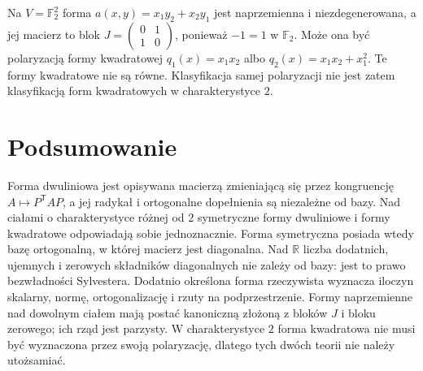 \begin{przyklad}
\label{prz:lin9-char2-formy}
Na \(V=\mathbb F_2^2\) forma
\(a(x,y)=x_1y_2+x_2y_1\)
jest naprzemienna i niezdegenerowana,
a jej macierz to blok
\(J=\begin{pmatrix}0&1\\1&0\end{pmatrix}\),
ponieważ \(-1=1\) w \(\mathbb F_2\).
Może ona być polaryzacją formy
kwadratowej \(q_1(x)=x_1x_2\)
albo \(q_2(x)=x_1x_2+x_1^2\).
Te formy kwadratowe nie są równe.
Klasyfikacja samej polaryzacji
nie jest zatem klasyfikacją
form kwadratowych
w charakterystyce \(2\).
\end{przyklad}

\section{Podsumowanie}
\label{sec:lin9-podsumowanie}

Forma dwuliniowa jest opisywana
macierzą zmieniającą się
przez kongruencję
\(A\mapsto P^{\mathsf T}AP\),
a jej radykał i ortogonalne
dopełnienia są niezależne od bazy.
Nad ciałami o charakterystyce
różnej od \(2\) symetryczne
formy dwuliniowe i formy
kwadratowe odpowiadają
sobie jednoznacznie.
Forma symetryczna posiada
wtedy bazę ortogonalną,
w której macierz jest diagonalna.
Nad \(\mathbb R\) liczba
dodatnich, ujemnych i zerowych
składników diagonalnych
nie zależy od bazy:
jest to prawo bezwładności
Sylvestera.
Dodatnio określona forma
rzeczywista wyznacza
iloczyn skalarny, normę,
ortogonalizację i rzuty
na podprzestrzenie.
Formy naprzemienne nad
dowolnym ciałem mają
postać kanoniczną złożoną
z bloków \(J\) i bloku zerowego;
ich rząd jest parzysty.
W charakterystyce \(2\)
forma kwadratowa nie musi
być wyznaczona przez swoją
polaryzację, dlatego
tych dwóch teorii
nie należy utożsamiać.

